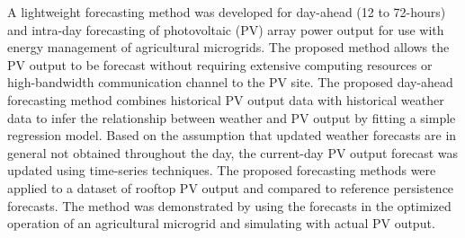 A lightweight forecasting method was developed for day-ahead (12 to 72-hours) and intra-day forecasting of photovoltaic (PV) array power output for use with energy management of agricultural microgrids.
The proposed method allows the PV output to be forecast without requiring extensive computing resources or high-bandwidth communication channel to the PV site.
The proposed day-ahead forecasting method combines historical PV output data with historical weather data to infer the relationship between weather and PV output by fitting a simple regression model.
Based on the assumption that updated weather forecasts are in general not obtained throughout the day, the current-day PV output forecast was updated using time-series techniques.
The proposed forecasting methods were applied to a dataset of rooftop PV output
and compared to reference persistence forecasts.
The method was demonstrated by using the forecasts in the optimized operation of an agricultural microgrid
and simulating with actual PV output.